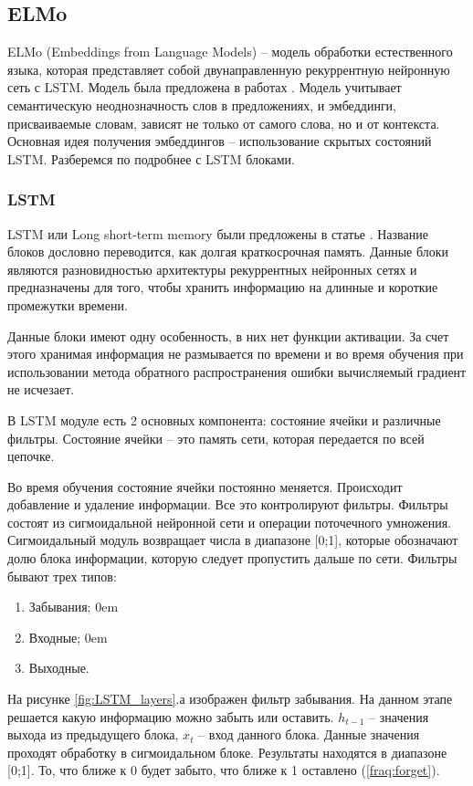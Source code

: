 \documentclass[a4paper,14pt]{article}
\begin{document}
\subsection{ELMo}

ELMo (Embeddings from Language Models) -- модель обработки естественного языка, которая представляет собой двунаправленную рекуррентную нейронную сеть с LSTM.
Модель была предложена в работах \cite{elmo1,elmo2,elmo3}.
Модель учитывает семантическую неоднозначность слов в предложениях, и эмбеддинги, присваиваемые словам, зависят не только от самого слова, но и от контекста.
Основная идея получения эмбеддингов -- использование скрытых состояний LSTM.
Разберемся по подробнее с LSTM блоками.

\subsubsection{LSTM}

LSTM или Long short-term memory были предложены в статье \cite{lstm}.
Название блоков дословно переводится, как долгая краткосрочная память.
Данные блоки являются разновидностью архитектуры рекуррентных нейронных сетях и предназначены для того, чтобы хранить информацию на длинные и короткие промежутки времени.

Данные блоки имеют одну особенность, в них нет функции активации.
За счет этого хранимая информация не размывается по времени и во время обучения при использовании метода обратного распространения ошибки вычисляемый градиент не исчезает.

В LSTM модуле есть 2 основных компонента: состояние ячейки и различные фильтры.
Состояние ячейки -- это память сети, которая передается по всей цепочке.

Во время обучения состояние ячейки постоянно меняется. Происходит добавление и удаление информации.
Все это контролируют фильтры.
Фильтры состоят из сигмоидальной нейронной сети и операции поточечного умножения.
Сигмоидальный модуль возвращает числа в диапазоне [0;1], которые обозначают долю блока информации, которую следует пропустить дальше по сети.
Фильтры бывают трех типов:
\begin{enumerate}
	\itemsep0em 
	\item Забывания;
	\itemsep0em 
	\item Входные;
	\itemsep0em 
	\item Выходные.
\end{enumerate}

На рисунке \ref{fig:LSTM_layers}.а изображен фильтр забывания.
На данном этапе решается какую информацию можно забыть или оставить.
$h_{t-1}$ -- значения выхода из предыдущего блока, $x_t$ -- вход данного блока.
Данные значения проходят обработку в сигмоидальном блоке.
Результаты находятся в диапазоне [0;1].
То, что ближе к 0 будет забыто, что ближе к 1 оставлено (\ref{fraq:forget}).
\end{document}

